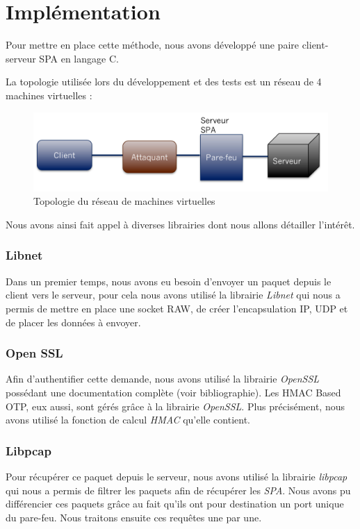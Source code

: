 \chapter{Implémentation}

Pour mettre en place cette méthode, nous avons développé une paire client-serveur SPA en langage C.

La topologie utilisée lors du développement et des tests est un réseau de 4 machines virtuelles : 

\begin{figure}[h]

\centerline{\includegraphics[scale=0.5]{topo_imple}}
\caption{Topologie du réseau de machines virtuelles}

\end{figure}
Nous avons ainsi fait appel à diverses librairies dont nous allons détailler l'intérêt.

\subsection{Libnet}
Dans un premier temps, nous avons eu besoin d'envoyer un paquet depuis le client vers le serveur, pour cela nous avons utilisé la librairie \emph{Libnet} qui nous a permis de mettre en place une socket RAW, de créer l'encapsulation IP, UDP et de placer les données à envoyer.

\subsection{Open SSL}
Afin d'authentifier cette demande, nous avons utilisé la librairie \emph{OpenSSL} possédant une documentation complète (voir bibliographie).
Les HMAC Based OTP, eux aussi, sont gérés grâce à la librairie \emph{OpenSSL}. Plus précisément, nous avons utilisé la fonction de calcul \emph{HMAC} qu'elle contient.

\subsection{Libpcap}
Pour récupérer ce paquet depuis le serveur, nous avons utilisé la librairie \emph{libpcap} qui nous a permis de filtrer les paquets afin de récupérer les \emph{SPA}. Nous avons pu différencier ces paquets grâce au fait qu'ils ont pour destination un port unique du pare-feu. Nous traitons ensuite ces requêtes une par une.


